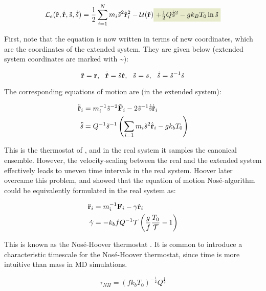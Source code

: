 \begin{equation}
	\mathcal{L}_e(\tilde\rvec, \dot{\tilde\rvec}, \tilde{s}, \dot{\tilde s}) = \frac{1}{2}\sum_{i=1}^N m_i \tilde s^2 \dot{\tilde\rvec}_i^2 - \mathcal{U}(\tilde\rvec) 
	\tikz[baseline] {
		\node [fill=green!20, anchor=base] (t1) {$+ \frac{1}{2} Q \dot{\tilde s}^2 - gk_BT_0 \ln\tilde s $};
	}
\end{equation}


First, note that the equation is now written in terms of new coordinates, which are the coordinates of the extended system. They are given below (extended system coordinates are marked with \textasciitilde): 

\begin{equation}
	\tilde\rvec = \rvec, \ \ \dot{\tilde\rvec} = \tilde s \dot\rvec, \ \ \tilde s = s, \ \ \dot{\tilde s} = \tilde s^{-1} \dot{s}
\end{equation}

The corresponding equations of motion are (in the extended system):

\begin{align}
	\ddot{\tilde{\mathbf{r}}}_i & = m_i^{-1} \tilde s^{-2} \tilde{\mathbf{F}}_i - 2\tilde s^{-1} \dot{\tilde s} \dot{\tilde{\mathbf{r}}}_i \\
	\ddot{\tilde s} & =  Q^{-1} \tilde s^{-1} \left(\sum_{i=1}m_i\tilde s^2 \dot{\tilde{\mathbf{r}}}_i - gk_bT_0\right)
\end{align}

This is the thermostat of \citet{Nose1984}, and in the real system it samples the canonical ensemble. However, the velocity-scaling between the real and the extended system effectively leads to uneven time intervals in the real system. Hoover later overcame this problem, and showed that the equation of motion Nosé-algorithm could be equivalently formulated in the real system as:

\begin{align}
	\ddot {\mathbf{r}}_i & = m_i^{-1} \mathbf{F}_i -\gamma \dot{\mathbf{r}}_i \\
	\dot \gamma & = -k_b f Q^{-1} \mathcal{T} \left(\frac{g}{f} \frac{T_0}{\mathcal{T}}-1\right)
\end{align}

This is known as the Nosé-Hoover thermostat \cite{PhysRevA.31.1695}. It is common to introduce a characteristic timescale for the Nosé-Hoover thermostat, since time is more intuitive than mass in MD simulations. 

\begin{equation}
	\tau_{NH} = (fk_b T_0)^{-\frac{1}{2}} Q^{\frac{1}{2}}
\end{equation}

